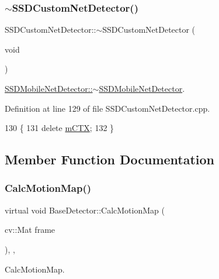 \subsubsection{\texorpdfstring{$\sim$\+S\+S\+D\+Custom\+Net\+Detector()}{~SSDCustomNetDetector()}}
{\footnotesize\ttfamily S\+S\+D\+Custom\+Net\+Detector\+::$\sim$\+S\+S\+D\+Custom\+Net\+Detector (\begin{DoxyParamCaption}\item[{void}]{ }\end{DoxyParamCaption})}



\mbox{\hyperlink{class_s_s_d_mobile_net_detector_aab4a87e950c5d0ea2631f8f7d521dc1c}{S\+S\+D\+Mobile\+Net\+Detector\+::$\sim$\+S\+S\+D\+Mobile\+Net\+Detector}}. 



Definition at line 129 of file S\+S\+D\+Custom\+Net\+Detector.\+cpp.


\begin{DoxyCode}
130 \{
131     \textcolor{keyword}{delete} \mbox{\hyperlink{class_s_s_d_custom_net_detector_ad0d9609d8e5b22e28cae854f0ac06058}{mCTX}};
132 \}
\end{DoxyCode}


\subsection{Member Function Documentation}
\mbox{\label{class_base_detector_a73c66f0d4dad263fcf65c09a6f6feda2}} 
\subsubsection{\texorpdfstring{Calc\+Motion\+Map()}{CalcMotionMap()}}
{\footnotesize\ttfamily virtual void Base\+Detector\+::\+Calc\+Motion\+Map (\begin{DoxyParamCaption}\item[{cv\+::\+Mat}]{frame }\end{DoxyParamCaption})\hspace{0.3cm}{\ttfamily [inline]}, {\ttfamily [virtual]}, {\ttfamily [inherited]}}



Calc\+Motion\+Map. 


